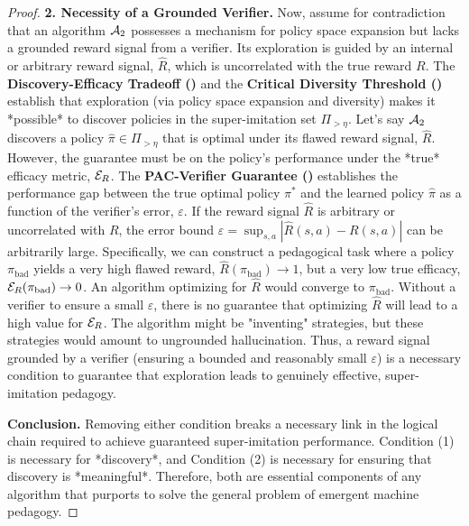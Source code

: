 \begin{proof}
\noindent\textbf{2. Necessity of a Grounded Verifier.}
Now, assume for contradiction that an algorithm $\mathcal{A}_2$ possesses a mechanism for policy space expansion but lacks a grounded reward signal from a verifier. Its exploration is guided by an internal or arbitrary reward signal, $\hat{R}$, which is uncorrelated with the true reward $R$.
The \textbf{Discovery-Efficacy Tradeoff ()} and the \textbf{Critical Diversity Threshold ()} establish that exploration (via policy space expansion and diversity) makes it *possible* to discover policies in the super-imitation set $\Pi_{> \eta}$. Let's say $\mathcal{A}_2$ discovers a policy $\hat{\pi} \in \Pi_{> \eta}$ that is optimal under its flawed reward signal, $\hat{R}$.
However, the guarantee must be on the policy's performance under the *true* efficacy metric, $\mathcal{E}_R$. The \textbf{PAC-Verifier Guarantee ()} establishes the performance gap between the true optimal policy $\pi^*$ and the learned policy $\hat{\pi}$ as a function of the verifier's error, $\varepsilon$.
If the reward signal $\hat{R}$ is arbitrary or uncorrelated with $R$, the error bound $\varepsilon = \sup_{s,a} |\hat{R}(s,a) - R(s,a)|$ can be arbitrarily large. Specifically, we can construct a pedagogical task where a policy $\pi_{\text{bad}}$ yields a very high flawed reward, $\hat{R}(\pi_{\text{bad}}) \to 1$, but a very low true efficacy, $\mathcal{E}_R(\pi_{\text{bad}}) \to 0$. An algorithm optimizing for $\hat{R}$ would converge to $\pi_{\text{bad}}$.
Without a verifier to ensure a small $\varepsilon$, there is no guarantee that optimizing $\hat{R}$ will lead to a high value for $\mathcal{E}_R$. The algorithm might be "inventing" strategies, but these strategies would amount to ungrounded hallucination.
Thus, a reward signal grounded by a verifier (ensuring a bounded and reasonably small $\varepsilon$) is a necessary condition to guarantee that exploration leads to genuinely effective, super-imitation pedagogy.

\noindent\textbf{Conclusion.}
Removing either condition breaks a necessary link in the logical chain required to achieve guaranteed super-imitation performance. Condition (1) is necessary for *discovery*, and Condition (2) is necessary for ensuring that discovery is *meaningful*. Therefore, both are essential components of any algorithm that purports to solve the general problem of emergent machine pedagogy.
\end{proof}


